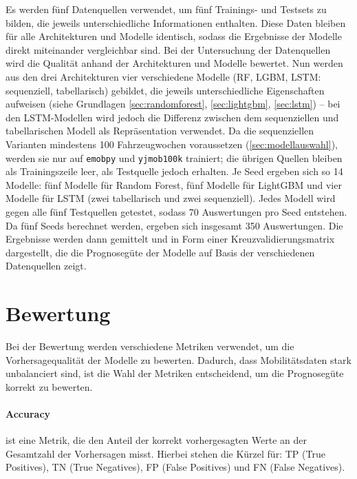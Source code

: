 Es werden fünf Datenquellen verwendet, um fünf Trainings- und Testsets zu bilden, die jeweils unterschiedliche Informationen enthalten. Diese Daten bleiben für alle Architekturen und Modelle identisch, sodass die Ergebnisse der Modelle direkt miteinander vergleichbar sind. Bei der Untersuchung der Datenquellen wird die Qualität anhand der Architekturen und Modelle bewertet. Nun werden aus den drei Architekturen vier verschiedene Modelle (RF, LGBM, LSTM: sequenziell, tabellarisch) gebildet, die jeweils unterschiedliche Eigenschaften aufweisen (siehe Grundlagen \cref{sec:randomforest}, \cref{sec:lightgbm}, \cref{sec:lstm}) -- bei den LSTM-Modellen wird jedoch die Differenz zwischen dem sequenziellen und tabellarischen Modell als Repräsentation verwendet. Da die sequenziellen Varianten mindestens 100 Fahrzeugwochen voraussetzen (\cref{sec:modellauswahl}), werden sie nur auf \texttt{emobpy} und \texttt{yjmob100k} trainiert; die übrigen Quellen bleiben als Trainingszeile leer, als Testquelle jedoch erhalten. 
Je Seed ergeben sich so 14 Modelle: fünf Modelle für Random Forest, fünf Modelle für LightGBM und vier Modelle für LSTM (zwei tabellarisch und zwei sequenziell). Jedes Modell wird gegen alle fünf Testquellen getestet, sodass 70 Auswertungen pro Seed entstehen. Da fünf Seeds berechnet werden, ergeben sich insgesamt 350 Auswertungen. Die Ergebnisse werden dann gemittelt und in Form einer Kreuzvalidierungsmatrix dargestellt, die die Prognosegüte der Modelle auf Basis der verschiedenen Datenquellen zeigt. 


\section{Bewertung}
\label{sec:bewertung}

Bei der Bewertung werden verschiedene Metriken verwendet, um die Vorhersagequalität der Modelle zu bewerten. Dadurch, dass Mobilitätsdaten stark unbalanciert sind, ist die Wahl der Metriken entscheidend, um die Prognosegüte korrekt zu bewerten.

\paragraph{Accuracy} ist eine Metrik, die den Anteil der korrekt vorhergesagten Werte an der Gesamtzahl der Vorhersagen misst. Hierbei stehen die Kürzel für: 
TP (True Positives), TN (True Negatives), FP (False Positives) und FN (False Negatives). 

